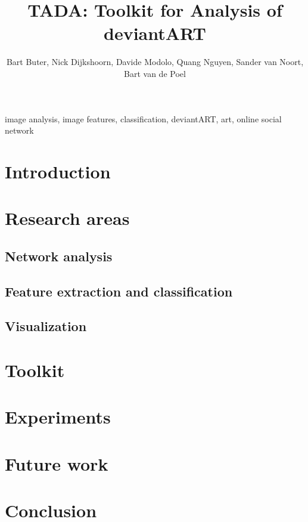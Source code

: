 \documentclass[10pt,journal,compsoc]{IEEEtran}
\begin{document}
\title{TADA: Toolkit for Analysis of deviantART}
\author{Bart Buter, Nick Dijkshoorn, Davide Modolo, Quang Nguyen, Sander van Noort, Bart van de Poel}

\maketitle


\begin{abstract}

\end{abstract}


\begin{keywords}
image analysis, image features, classification, deviantART, art, online social network
\end{keywords}


\section{Introduction}



\section{Research areas}
	\subsection{Network analysis}
	
	\subsection{Feature extraction and classification}
	
	\subsection{Visualization}
	


\section{Toolkit}


\section{Experiments}



\section{Future work}


\section{Conclusion}


%

\nocite{*}



\pagebreak
\tableofcontents
\end{document}

